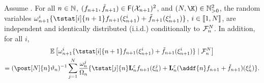 \begin{lemma}
\label{lem:expectation:incremental:marginal}
Assume . For all $n \in \mathbb{N}$, $(f_{n + 1}, \tilde{f}_{n + 1}) \in \mathsf{F}(\mathcal{X}_{n + 1})^2$, and $(\N, \K) \in \nsetpos^2$, the random variables $\ewght{n + 1}{i}\{\tstat[i]{n + 1} f_{n + 1}(\epart{n + 1}{i}) + \ftd{n + 1}(\epart{n + 1}{i})\}$, $i \in \llbracket 1, N \rrbracket$, are independent and identically distributed (i.i.d.) conditionally to $\mathcal{F}_{n}^{N}$. In addition, for all $i$,  
\begin{multline*}
\pE \left[\ewght{n + 1}{i}\{\tstat[i]{n + 1}f_{n + 1}(\epart{n + 1}{i}) + \ftd{n + 1}(\epart{n + 1}{i})\} \cond  \calF{n}{\N} \right] \\
 = (\post[\N]{n} \adjfuncforward{n})^{-1} 
 \sum_{j = 1}^\N \frac{\ewght{n}{j}}{\sumwght{n}}
\{ \tstat[j]{n} \ukmod{n} f_{n + 1}(\epart{n}{j}) + \ukmod{n}(\addf{n} f_{n + 1} + \ftd{n + 1})(\epart{n}{j})\}.
\end{multline*}
\end{lemma}


